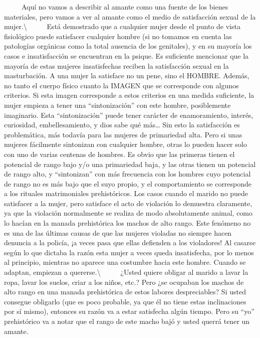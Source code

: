 ~ ~ ~ Aquí no vamos a describir al amante como una fuente de los bienes
materiales, pero vamos a ver al amante como el medio de satisfacción
sexual de la mujer.\textbackslash{} ~ ~ ~ Está demostrado que a
cualquier mujer desde el punto de vista fisiológico puede satisfacer
cualquier hombre (si no tomamos en cuenta las patologías orgánicas como
la total ausencia de los genitales), y en su mayoría los casos e
insatisfacción se encuentran en la psique. Es suficiente mencionar que
la mayoría de estas mujeres insatisfechas reciben la satisfacción sexual
en la masturbación. A una mujer la satisface no un pene, sino el HOMBRE.
Además, no tanto el cuerpo físico cuanto la IMAGEN que se corresponde
con algunos criterios. Si esta imagen corresponde a estos criterios en
una medida suficiente, la mujer empieza a tener una ``sintonización''
con este hombre, posiblemente imaginario. Esta ``sintonización'' puede
tener carácter de enamoramiento, interés, curiosidad, embellesamiento, y
dios sabe qué más\ldots{} Sin esto la satisfacción es problemática, más
todavía para las mujeres de primariedad alta. Pero si unas mujeres
fácilmente sintonizan con cualquier hombre, otras lo pueden hacer solo
con uno de varias centenas de hombres. Es obvio que las primeras tienen
el potencial de rango bajo y/o una primariedad baja, y las otras tienen
un potencial de rango alto, y ``sintonizan'' con más frecuencia con los
hombres cuyo potencial de rango no es más bajo que el suyo propio, y el
comportamiento se corresponde a los rituales matrimoniales
prehistóricos. Los casos cuando el marido no puede satisfacer a la
mujer, pero satisface el acto de violación lo demuestra claramente, ya
que la violación normalmente se realiza de modo absolutamente animal,
como lo hacían en la manada prehistórica los machos de alto rango. Este
fenómeno no es una de las últimas causas de que las mujeres violadas no
siempre hacen denuncia a la policía, ¡a veces pasa que ellas defienden a
los violadores! Al casarse según lo que dictaba la razón esta mujer a
veces queda insatisfecha, por lo menos al principio, mientras no aparece
una costumbre hacia este hombre. Cuando se adaptan, empiezan a
quererse.\textbackslash{} ~ ~ ~ ¿Usted quiere obligar al marido a lavar
la ropa, lavar los suelos, criar a los niños, etc.? Pero ¿se ocupaban
los machos de alto rango en una manada prehistórica de estos labores
despreciables? Si usted consegue obligarlo (que es poco probable, ya que
él no tiene estas inclinaciones por sí mismo), entonces su razón va a
estar satisfecha algún tiempo. Pero su ``yo'' prehistórico va a notar
que el rango de este macho bajó y usted querrá tener un amante.

